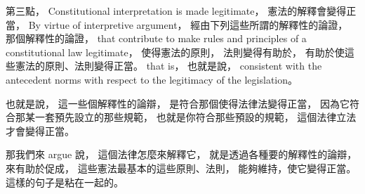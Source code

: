 \hypertarget{w02:cue:133}{}第三點，
\hypertarget{w02:cue:134}{}Constitutional interpretation is made legitimate，
\hypertarget{w02:cue:135}{}憲法的解釋會變得正當，
\hypertarget{w02:cue:136}{}By virtue of interpretive argument，
\hypertarget{w02:cue:137}{}經由下列這些所謂的解釋性的論證，
\hypertarget{w02:cue:138}{}那個解釋性的論證，
\hypertarget{w02:cue:139}{}that contribute to make rules and principles of a constitutional law legitimate，
\hypertarget{w02:cue:140}{}使得憲法的原則，
\hypertarget{w02:cue:141}{}法則變得有助於，
\hypertarget{w02:cue:142}{}有助於使這些憲法的原則、法則變得正當。
\hypertarget{w02:cue:143}{}that is，
\hypertarget{w02:cue:144}{}也就是說，
\hypertarget{w02:cue:145}{}consistent with the antecedent norms
\hypertarget{w02:cue:146}{}with respect to the legitimacy of the legislation。

\hypertarget{w02:cue:147}{}也就是說，
\hypertarget{w02:cue:148}{}這一些個解釋性的論辯，
\hypertarget{w02:cue:149}{}是符合那個使得法律法變得正當，
\hypertarget{w02:cue:150}{}因為它符合那某一套預先設立的那些規範，
\hypertarget{w02:cue:151}{}也就是你符合那些預設的規範，
\hypertarget{w02:cue:152}{}這個法律立法才會變得正當。

\hypertarget{w02:cue:153}{}那我們來 argue 說，
\hypertarget{w02:cue:154}{}這個法律怎麼來解釋它，
\hypertarget{w02:cue:155}{}就是透過各種要的解釋性的論辯，
\hypertarget{w02:cue:156}{}來有助於促成，
\hypertarget{w02:cue:157}{}這些憲法最基本的這些原則、法則，
\hypertarget{w02:cue:158}{}能夠維持，使它變得正當。
\hypertarget{w02:cue:159}{}這樣的句子是粘在一起的。

